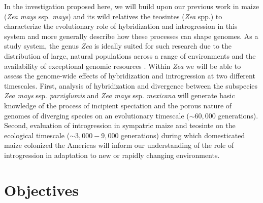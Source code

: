 In the investigation proposed here, we will build upon our previous work in maize (\emph{Zea mays} ssp. \emph{mays}) and its wild relatives the teosintes (\emph{Zea} spp.) to characterize the evolutionary role of hybridization and introgression in this system and more generally describe how these processes can shape genomes. 
As a study system, the genus \emph{Zea} is ideally suited for such research due to the distribution of large, natural populations across a range of environments and the availability of exceptional genomic resources \citep{Hufford2012}.  Within \emph{Zea} we will be able to assess the genome-wide effects of hybridization and introgression at two different timescales.  
First, analysis of hybridization and divergence between the subspecies \emph{Zea mays} ssp. \emph{parviglumis} and \emph{Zea mays} ssp. \emph{mexicana} will generate basic knowledge of the process of incipient speciation and the porous nature of genomes of diverging species on an evolutionary timescale ($\sim60,000$ generations).
Second, evaluation of introgression in sympatric maize and teosinte on the ecological timescale ($\sim3,000-9,000$ generations) during which domesticated maize colonized the Americas will inform our understanding of the role of introgression in adaptation to new or rapidly changing environments.   

\section*{Objectives}
	

